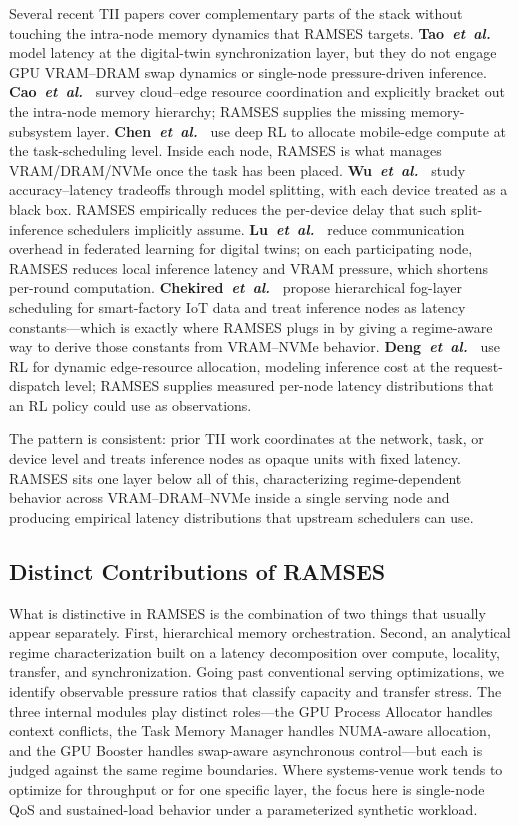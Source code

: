 Several recent TII papers cover complementary parts of the stack
without touching the intra-node memory dynamics that RAMSES targets.
\textbf{Tao~\emph{et~al.}~\cite{tao2019digitaltwin}} model latency
at the digital-twin synchronization layer, but they do not engage
GPU VRAM--DRAM swap dynamics or single-node pressure-driven inference.
\textbf{Cao~\emph{et~al.}~\cite{cao2021edgecps}} survey cloud--edge
resource coordination and explicitly bracket out the intra-node memory
hierarchy; RAMSES supplies the missing memory-subsystem layer.
\textbf{Chen~\emph{et~al.}~\cite{chen2021drl}} use deep RL to allocate
mobile-edge compute at the task-scheduling level. Inside each node,
RAMSES is what manages VRAM/DRAM/NVMe once the task has been placed.
\textbf{Wu~\emph{et~al.}~\cite{wu2021dnninference}} study
accuracy--latency tradeoffs through model splitting, with each device
treated as a black box. RAMSES empirically reduces the per-device delay that such
split-inference schedulers implicitly assume.
\textbf{Lu~\emph{et~al.}~\cite{lu2021dtfl}} reduce communication
overhead in federated learning for digital twins; on each participating
node, RAMSES reduces local inference latency and VRAM pressure, which
shortens per-round computation.
\textbf{Chekired~\emph{et~al.}~\cite{chekired2018fogscheduling}}
propose hierarchical fog-layer scheduling for smart-factory IoT data
and treat inference nodes as latency constants---which is exactly
where RAMSES plugs in by giving a regime-aware way to derive those
constants from VRAM--NVMe behavior.
\textbf{Deng~\emph{et~al.}~\cite{deng2020edgerl}} use RL for dynamic
edge-resource allocation, modeling inference cost at the
request-dispatch level; RAMSES supplies measured per-node latency distributions that an RL policy could use as observations.

The pattern is consistent: prior TII work coordinates at the network,
task, or device level and treats inference nodes as opaque units with
fixed latency. RAMSES sits one layer below all of this, characterizing
regime-dependent behavior across VRAM--DRAM--NVMe inside a single
serving node and producing empirical latency distributions that upstream schedulers can use.

\subsection{Distinct Contributions of RAMSES}

What is distinctive in RAMSES is the combination of two things that
usually appear separately. First, hierarchical memory orchestration.
Second, an analytical regime characterization built on a latency
decomposition over compute, locality, transfer, and synchronization.
Going past conventional serving optimizations, we identify
observable pressure ratios that classify capacity and transfer stress.
The three internal modules play distinct roles---the GPU Process
Allocator handles context conflicts, the Task Memory Manager handles
NUMA-aware allocation, and the GPU Booster handles swap-aware
asynchronous control---but each is judged against the same regime
boundaries. Where systems-venue work tends to optimize for throughput
or for one specific layer, the focus here is single-node QoS and sustained-load behavior under a parameterized synthetic workload.
